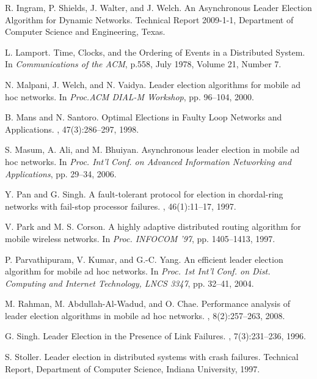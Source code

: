 \documentclass{article}
\begin{document}
\begin{thebibliography}{1}
R. Ingram, P. Shields, J. Walter, and J. Welch.
\newblock An Asynchronous Leader Election Algorithm for Dynamic Networks. Technical Report 2009-1-1, Department of Computer Science and Engineering, Texas.

L. Lamport.
\newblock  Time, Clocks, and the Ordering of Events in a Distributed System.
\newblock In {\em Communications of the ACM}, p.558, July 1978, Volume 21, Number 7.


N. Malpani, J. Welch, and N. Vaidya.
\newblock  Leader election algorithms for mobile ad hoc networks.
\newblock In {\em Proc.ACM DIAL-M Workshop}, pp. 96–104, 2000.

B. Mans and N. Santoro.
\newblock  Optimal Elections in Faulty Loop Networks and Applications.
, 47(3):286–297, 1998.

S. Masum, A. Ali, and M. Bhuiyan.
\newblock  Asynchronous leader election in mobile ad hoc networks.
\newblock In {\em Proc. Int’l Conf. on Advanced Information Networking and Applications}, pp. 29–34, 2006.

Y. Pan and G. Singh.
\newblock A fault-tolerant protocol for election in chordal-ring networks with fail-stop processor failures.
, 46(1):11–17, 1997.

V. Park and M. S. Corson.
\newblock A highly adaptive distributed routing algorithm for mobile wireless networks.
\newblock In {\em Proc. INFOCOM ’97}, pp. 1405–1413, 1997.

P. Parvathipuram, V. Kumar, and G.-C. Yang.
\newblock An efficient leader election algorithm for mobile ad hoc networks.
\newblock In {\em Proc. 1st Int’l Conf. on Dist. Computing and Internet Technology, LNCS 3347}, pp. 32–41, 2004.

M. Rahman, M. Abdullah-Al-Wadud, and O. Chae.
\newblock Performance analysis of leader election algorithms in mobile ad hoc networks.
, 8(2):257–263, 2008.

G. Singh.
\newblock Leader Election in the Presence of Link Failures.
, 7(3):231–236, 1996.

S. Stoller.
\newblock Leader election in distributed systems with crash failures.
\newblock Technical Report, Department of Computer Science, Indiana University, 1997.


\end{thebibliography}
\end{document}
